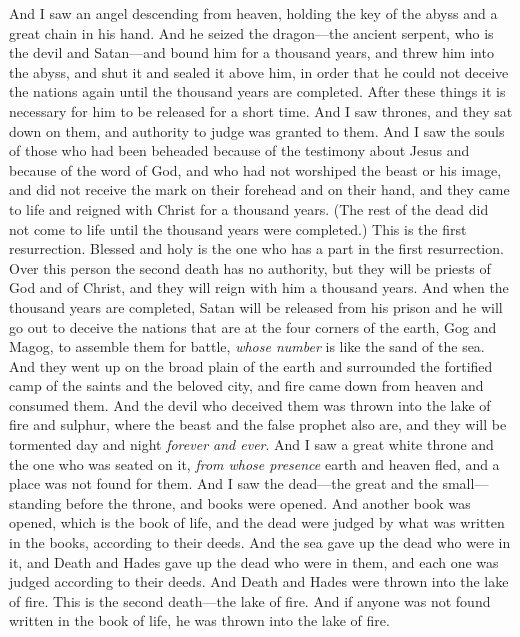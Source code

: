 \begin{biblechapter} %
 And I saw an angel descending from heaven, holding the key of the abyss and a great chain in his hand.
\verse And he seized the dragon—the ancient serpent, who is the devil and Satan—and bound him for a thousand years,
\verse and threw him into the abyss, and shut it and sealed it above him, in order that he could not deceive the nations again until the thousand years are completed. After these things it is necessary for him to be released for a short time.
\verse And I saw thrones, and they sat down on them, and authority to judge was granted to them. And I saw the souls of those who had been beheaded because of the testimony about Jesus and because of the word of God, and who had not worshiped the beast or his image, and did not receive the mark on their forehead and on their hand, and they came to life and reigned with Christ for a thousand years.
\verse (The rest of the dead did not come to life until the thousand years were completed.) This is the first resurrection.
\verse Blessed and holy is the one who has a part in the first resurrection. Over this person the second death has no authority, but they will be priests of God and of Christ, and they will reign with him a thousand years.
 And when the thousand years are completed, Satan will be released from his prison
\verse and he will go out to deceive the nations that are at the four corners of the earth, Gog and Magog, to assemble them for battle, \textit{whose number} is like the sand of the sea.
\verse And they went up on the broad plain of the earth and surrounded the fortified camp of the saints and the beloved city, and fire came down from heaven and consumed them.
\verse And the devil who deceived them was thrown into the lake of fire and sulphur, where the beast and the false prophet also are, and they will be tormented day and night \textit{forever and ever}.
 And I saw a great white throne and the one who was seated on it, \textit{from whose presence} earth and heaven fled, and a place was not found for them.
\verse And I saw the dead—the great and the small—standing before the throne, and books were opened. And another book was opened, which is the book of life, and the dead were judged by what was written in the books, according to their deeds.
\verse And the sea gave up the dead who were in it, and Death and Hades gave up the dead who were in them, and each one was judged according to their deeds.
\verse And Death and Hades were thrown into the lake of fire. This is the second death—the lake of fire.
\verse And if anyone was not found written in the book of life, he was thrown into the lake of fire.
\end{biblechapter}

